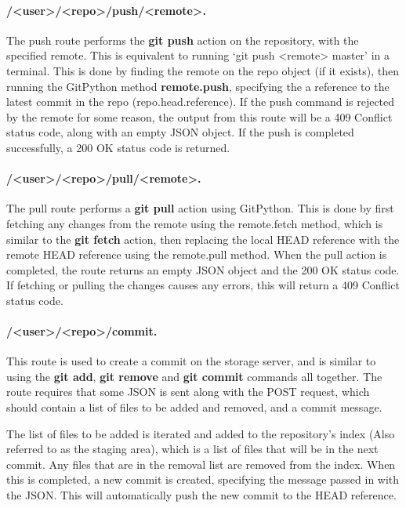 	\paragraph{/<user>/<repo>/push/<remote>.}
	The push route performs the \textbf{git push} action on the repository, with the specified remote. This is equivalent to running `git push <remote> master' in a terminal. This is done by finding the remote on the repo object (if it exists), then running the GitPython method \textbf{remote.push}, specifying the a reference to the latest commit in the repo (repo.head.reference). If the push command is rejected by the remote for some reason, the output from this route will be a 409 Conflict status code, along with an empty JSON object. If the push is completed successfully, a 200 OK status code is returned.

	\paragraph{/<user>/<repo>/pull/<remote>.}
	The pull route performs a \textbf{git pull} action using GitPython. This is done by first fetching any changes from the remote using the remote.fetch method, which is similar to the \textbf{git fetch} action, then replacing the local HEAD reference with the remote HEAD reference using the remote.pull method. When the pull action is completed, the route returns an empty JSON object and the 200 OK status code. If fetching or pulling the changes causes any errors, this will return a 409 Conflict status code.

	\paragraph{/<user>/<repo>/commit.}
	This route is used to create a commit on the storage server, and is similar to using the \textbf{git add}, \textbf{git remove} and \textbf{git commit} commands all together. The route requires that some JSON is sent along with the POST request, which should contain a list of files to be added and removed, and a commit message.

	The list of files to be added is iterated and added to the repository's index (Also referred to as the staging area), which is a list of files that will be in the next commit. Any files that are in the removal list are removed from the index. When this is completed, a new commit is created, specifying the message passed in with the JSON. This will automatically push the new commit to the HEAD reference.

